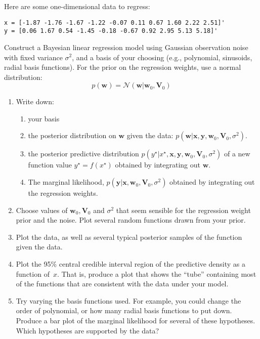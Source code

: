 \documentclass{harvardml}
\newcommand{\bx}{\mathbf{x}}
\newcommand{\by}{\mathbf{y}}
\newcommand{\bw}{\mathbf{w}}
\newcommand{\distNorm}{\mathcal{N}}
\begin{document}
\begin{problem}
Here are some one-dimensional data to regress:
\begin{verbatim}
x = [-1.87 -1.76 -1.67 -1.22 -0.07 0.11 0.67 1.60 2.22 2.51]'
y = [0.06 1.67 0.54 -1.45 -0.18 -0.67 0.92 2.95 5.13 5.18]'
\end{verbatim}
Construct a Bayesian linear regression model using Gaussian observation noise with fixed variance $\sigma^2$, and a basis of your choosing (e.g., polynomial, sinusoids, radial basis functions).
For the prior on the regression weights, use a normal distribution:
$$p(\bw) = \distNorm(\bw | \bw_0, \mathbf V_0)$$


\begin{enumerate}
  \item Write down:
  \begin{enumerate}
  	\item your basis
  	\item the posterior distribution on $\bw$ given the data: $p(\bw | \bx, \by, \bw_0, \mathbf V_0, \sigma^2)$.
  	\item the posterior predictive distribution $p(y^\star | x^\star, \bx, \by, \bw_0, \mathbf V_0, \sigma^2)$ of a new function value $y^\star = f(x^\star)$ obtained by integrating out $\bw$.
	\item The marginal likelihood, $p(\by | \bx, \bw_0,\boldsymbol V_0, \sigma^2)$ obtained by integrating out the regression weights.
  \end{enumerate}
  \item Choose values of $\bw_0, \mathbf V_0$ and $\sigma^2$ that seem sensible for the regression weight prior and the noise.
  Plot several random functions drawn from your prior.

  \item Plot the data, as well as several typical posterior samples of the function given the data.
    
  \item Plot the 95\% central credible interval region of the
    predictive density as a function of~$x$. That is, produce a plot
    that shows the ``tube'' containing most of the functions that are
    consistent with the data under your model.

  \item Try varying the basis functions used.  For example, you could change the
    order of polynomial, or how many radial basis functions to put
    down.  Produce a bar plot of the marginal likelihood for several of these hypotheses.
    Which hypotheses are supported by the data?
  \end{enumerate}
\end{problem}
\end{document}
